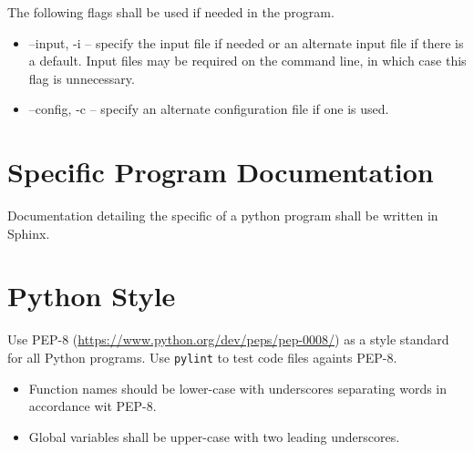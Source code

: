 The following flags shall be used if needed in the program.

\begin{itemize}
  \item --input, -i -- specify the input file if needed or an alternate
   input file if there is a default. Input files may be required on the
   command line, in which case this flag is unnecessary.

 \item --config, -c -- specify an alternate configuration file if one
   is used.
\end{itemize}


\section{Specific Program Documentation}

Documentation detailing the specific of a python program shall be
written in Sphinx.


\section{Python Style}

Use PEP-8  (\url{https://www.python.org/dev/peps/pep-0008/}) as a
style standard for all Python programs. Use \texttt{pylint} to test
code files againts PEP-8.

\begin{itemize}
  \item Function names should be lower-case with underscores
    separating words in accordance wit PEP-8.
  \item Global variables shall be upper-case with two leading
    underscores.
\end{itemize}
